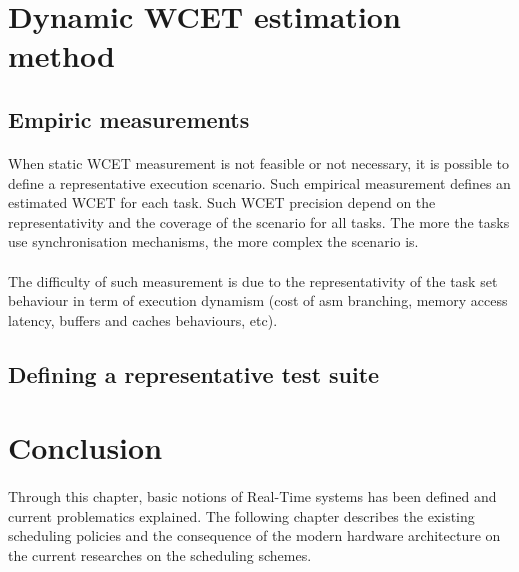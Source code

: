 \section{Dynamic WCET estimation method}

\subsection{Empiric measurements}

\paragraph{}
When static WCET measurement is not feasible or not necessary, it is possible to define a
representative execution scenario. Such empirical measurement defines an estimated WCET for each
task. Such WCET precision depend on the representativity and the coverage of the scenario for all
tasks. The more the tasks use synchronisation mechanisms, the more complex the scenario is.

\paragraph{}
The difficulty of such measurement is due to the representativity of the task set behaviour in term
of execution dynamism (cost of asm branching, memory access latency, buffers and caches behaviours, etc).

\subsection{Defining a representative test suite}

\section{Conclusion}

\paragraph{}
Through this chapter, basic notions of Real-Time systems has been defined and current problematics
explained. The following chapter describes the existing scheduling policies and the consequence of
the modern hardware architecture on the current researches on the scheduling schemes.

